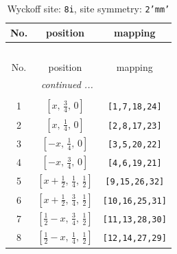\documentclass[fleqn,8pt]{jsarticle}
\begin{document}
\begin{longtable}{ccc}
\caption{Wyckoff site: {\tt 8i}, site symmetry: {\tt 2'mm'}}
 \\
 \hline \hline
No. & position & mapping \\ \hline \endfirsthead

\multicolumn{2}{l}{\tablename\ \thetable{}} \\
 \hline \hline
No. & position & mapping \\ \hline \endhead

 \hline \hline
\multicolumn{2}{r}{\footnotesize\it continued ...} \\ \endfoot

 \hline \hline
\multicolumn{2}{r}{} \\ \endlastfoot

1 & $\left[ x,\, \frac{3}{4},\, 0 \right]$ & {\tt [1,7,18,24]} \\ \hline
2 & $\left[ x,\, \frac{1}{4},\, 0 \right]$ & {\tt [2,8,17,23]} \\ \hline
3 & $\left[ - x,\, \frac{1}{4},\, 0 \right]$ & {\tt [3,5,20,22]} \\ \hline
4 & $\left[ - x,\, \frac{3}{4},\, 0 \right]$ & {\tt [4,6,19,21]} \\ \hline
5 & $\left[ x + \frac{1}{2},\, \frac{1}{4},\, \frac{1}{2} \right]$ & {\tt [9,15,26,32]} \\ \hline
6 & $\left[ x + \frac{1}{2},\, \frac{3}{4},\, \frac{1}{2} \right]$ & {\tt [10,16,25,31]} \\ \hline
7 & $\left[ \frac{1}{2} - x,\, \frac{3}{4},\, \frac{1}{2} \right]$ & {\tt [11,13,28,30]} \\ \hline
8 & $\left[ \frac{1}{2} - x,\, \frac{1}{4},\, \frac{1}{2} \right]$ & {\tt [12,14,27,29]} \\
\end{longtable}
\renewcommand{\arraystretch}{1.2}
\end{document}
